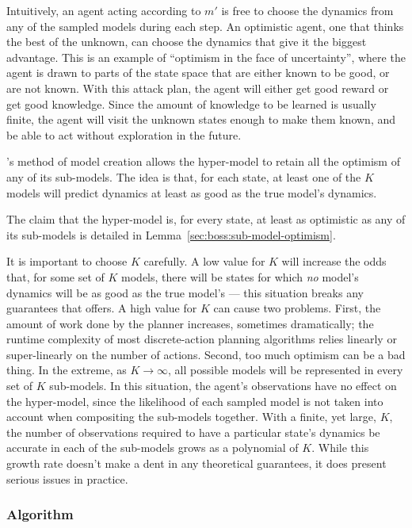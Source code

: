 Intuitively, an agent acting according to $m'$ is free to choose the dynamics from any of the sampled models during each step. An optimistic agent, one that thinks the best of the unknown, can choose the dynamics that give it the biggest advantage. This is an example of ``optimism in the face of uncertainty'', where the agent is drawn to parts of the state space that are either known to be good, or are not known. With this attack plan, the agent will either get good reward or get good knowledge. Since the amount of knowledge to be learned is usually finite, the agent will visit the unknown states enough to make them known, and be able to act without exploration in the future.

's method of model creation allows the hyper-model to retain all the optimism of any of its sub-models. The idea is that, for each state, at least one of the $K$ models will predict dynamics at least as good as the true model's dynamics.

The claim that the hyper-model is, for every state, at least as optimistic as any of its sub-models is detailed in Lemma~\ref{sec:boss:sub-model-optimism}.

It is important to choose $K$ carefully. A low value for $K$ will increase the odds that, for some set of $K$ models, there will be states for which \emph{no} model's dynamics will be as good as the true model's --- this situation breaks any guarantees that  offers. A high value for $K$ can cause two problems. First, the amount of work done by the planner increases, sometimes dramatically; the runtime complexity of most discrete-action planning algorithms relies linearly or super-linearly on the number of actions. Second, too much optimism can be a bad thing. In the extreme, as $K \rightarrow \infty$, all possible models will be represented in every set of $K$ sub-models. In this situation, the agent's observations have no effect on the hyper-model, since the likelihood of each sampled model is not taken into account when compositing the sub-models together. With a finite, yet large, $K$, the number of observations required to have a particular state's dynamics be accurate in each of the sub-models grows as a polynomial of $K$. While this growth rate doesn't make a dent in any theoretical guarantees, it does present serious issues in practice.

\subsubsection{Algorithm}

